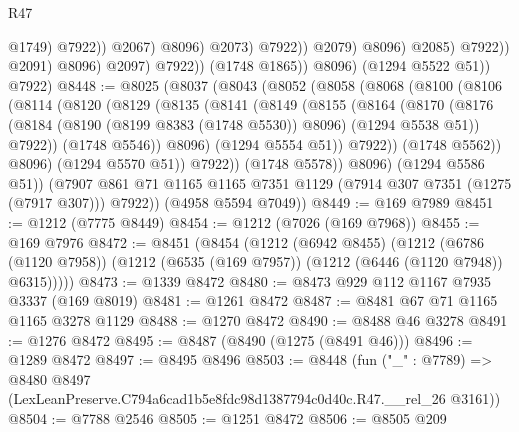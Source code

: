 \begin{lexlean}{R47}
\begin{coremodule}
                                                @1749)
                                              @7922))
                                          @2067)
                                        @8096)
                                      @2073)
                                    @7922))
                                @2079)
                              @8096)
                            @2085)
                          @7922))
                      @2091)
                    @8096)
                  @2097)
                @7922))
            (@1748 @1865))
          @8096)
        (@1294 @5522 @51))
      @7922)
@8448 := @8025
    (@8037
      (@8043
        (@8052
          (@8058
            (@8068
              (@8100
                (@8106
                  (@8114
                    (@8120
                      (@8129
                        (@8135
                          (@8141
                            (@8149
                              (@8155
                                (@8164
                                  (@8170
                                    (@8176
                                      (@8184
                                        (@8190 (@8199 @8383 (@1748 @5530)) @8096)
                                        (@1294 @5538 @51))
                                      @7922))
                                  (@1748 @5546))
                                @8096)
                              (@1294 @5554 @51))
                            @7922))
                        (@1748 @5562))
                      @8096)
                    (@1294 @5570 @51))
                  @7922))
              (@1748 @5578))
            @8096)
          (@1294 @5586 @51))
        (@7907 @861 @71 @1165 @1165 @7351 @1129 (@7914 @307 @7351 (@1275 (@7917 @307))) @7922))
      (@4958 @5594 @7049))
@8449 := @169 @7989
@8451 := @1212 (@7775 @8449)
@8454 := @1212 (@7026 (@169 @7968))
@8455 := @169 @7976
@8472 := @8451
    (@8454
      (@1212
        (@6942 @8455)
        (@1212
          (@6786 (@1120 @7958))
          (@1212 (@6535 (@169 @7957)) (@1212 (@6446 (@1120 @7948)) @6315)))))
@8473 := @1339 @8472
@8480 := @8473 @929 @112 @1167 @7935 @3337 (@169 @8019)
@8481 := @1261 @8472
@8487 := @8481 @67 @71 @1165 @1165 @3278 @1129
@8488 := @1270 @8472
@8490 := @8488 @46 @3278
@8491 := @1276 @8472
@8495 := @8487 (@8490 (@1275 (@8491 @46)))
@8496 := @1289 @8472
@8497 := @8495 @8496
@8503 := @8448
    (fun ("_" : @7789) =>
    @8480 @8497 (LexLeanPreserve.C794a6cad1b5e8fdc98d1387794c0d40c.R47.__rel_26 @3161))
@8504 := @7788 @2546
@8505 := @1251 @8472
@8506 := @8505 @209

\end{coremodule}
\end{lexlean}
